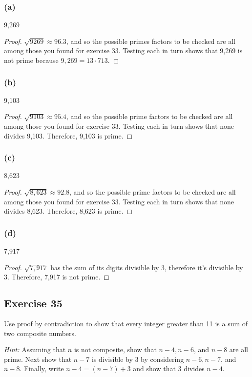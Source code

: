 \documentclass[14pt]{extarticle}
\begin{document}
\subsubsection{(a)}
9,269

\begin{proof}
$\sqrt{9269} \approx 96.3$, and so the possible primes factors to be checked are all among those you found for exercise 33. Testing each in turn shows that 9,269 is not prime because $9,269 = 13 \cdot 713$.

\end{proof}

\subsubsection{(b)}
9,103

\begin{proof}
$\sqrt{9103} \approx 95.4$, and so the possible prime factors to be checked are all among those you found for exercise 33. Testing each in turn shows that none divides 9,103. Therefore, 9,103 is prime.
\end{proof}

\subsubsection{(c)}
8,623

\begin{proof}
$\sqrt{8,623} \approx 92.8$, and so the possible prime factors to be checked are all among those you found for exercise 33. Testing each in turn shows that none divides
8,623. Therefore, 8,623 is prime.
\end{proof}

\subsubsection{(d)}
7,917

\begin{proof}
$\sqrt{7,917}$ has the sum of its digits divisible by 3, therefore it's divisible by 3. Therefore, 7,917 is not prime.
\end{proof}

\subsection{Exercise 35}
Use proof by contradiction to show that every integer greater than 11 is a sum of two composite numbers.

{\it Hint:} Assuming that $n$ is not composite, show that
$n - 4, n - 6$, and $n - 8$ are all prime. Next show that
$n - 7$ is divisible by 3 by considering $n - 6, n - 7$,
and $n - 8$. Finally, write $n - 4 = (n - 7) + 3$ and show
that 3 divides $n - 4$.
\end{document}

